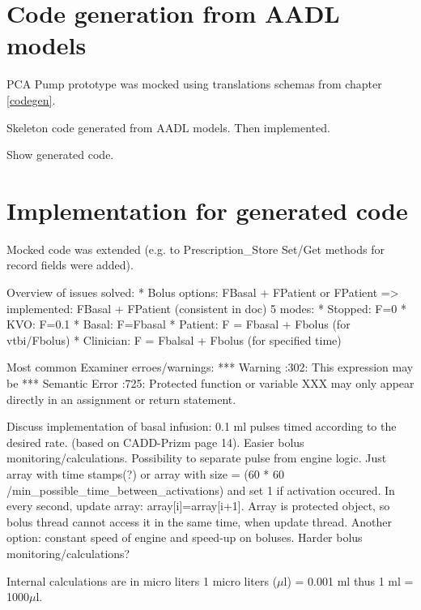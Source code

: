 \section{Code generation from AADL models}

PCA Pump prototype was mocked using translations schemas from chapter \ref{codegen}.

Skeleton code generated from AADL models. Then implemented.

Show generated code.



\section{Implementation for generated code}

Mocked code was extended (e.g. to Prescription\_Store Set/Get methods for record fields were added).

Overview of issues solved: 
* Bolus options: FBasal + FPatient or FPatient => implemented: FBasal + FPatient (consistent in doc)
5 modes:
* Stopped: F=0
* KVO: F=0.1
* Basal: F=Fbasal
* Patient: F = Fbasal + Fbolus (for vtbi/Fbolus)
* Clinician: F = Fbalsal + Fbolus (for specified time)

Most common Examiner\cite{Examiner:Online} erroes/warnings:
***        Warning                     :302: This expression may be
***        Semantic Error              :725: Protected function or variable XXX may only appear directly in an assignment or return statement.

Discuss implementation of basal infusion: 0.1 ml pulses timed according to the desired rate. (based on CADD-Prizm page 14). Easier bolus monitoring/calculations. Possibility to separate pulse from engine logic. Just array with time stamps(?) or array with size = (60 * 60 /min\_possible\_time\_between\_activations) and set 1 if activation occured. In every second, update array: array[i]=array[i+1]. Array is protected object, so bolus thread cannot access it in the same time, when update thread.
Another option: constant speed of engine and speed-up on boluses. Harder bolus monitoring/calculations?


Internal calculations are in micro liters 1 micro liters ($\mu$l) = 0.001 ml thus 1 ml = 1000$\mu$l.


